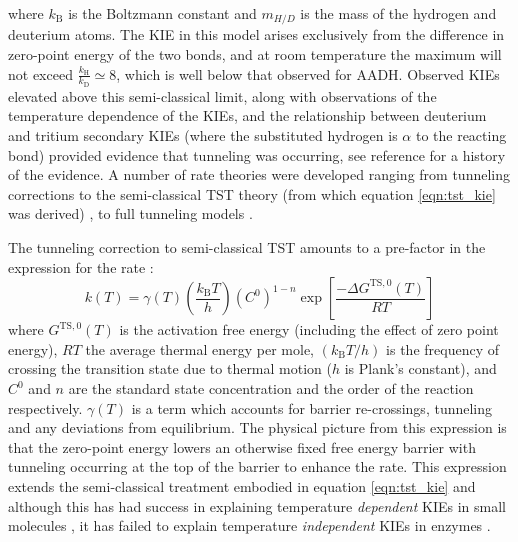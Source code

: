 where $k_{\mathrm{B}}$ is the Boltzmann constant and $m_{H/D}$ is the mass of the hydrogen and deuterium atoms. The KIE in this model arises exclusively from the difference in zero-point energy of the two bonds, and at room temperature the maximum will not exceed $\frac{k_{\mathrm{H}}}{k_{\mathrm{D}}} \simeq 8$,  which is well below that observed for AADH. Observed KIEs elevated above this semi-classical limit, along with observations of the temperature dependence of the KIEs, and the relationship between deuterium and tritium secondary KIEs (where the substituted hydrogen is $\alpha$ to the reacting bond) provided evidence that tunneling was occurring, see reference \cite{klinmanbeyond2009} for a history of the evidence. A number of rate theories were developed ranging from tunneling corrections to the semi-classical TST theory (from which equation \ref{eqn:tst_kie} was derived) \cite{bellTunnelEffectChemistry1980}, to full tunneling models \cite{antoniouLargeKineticIsotope1997, antoniouInternalEnzymeMotions2001, knappTemperatureDependentIsotopeEffects2002}. 

The tunneling correction to semi-classical TST amounts to a pre-factor in the expression for the rate \cite{garciavilocaHowEnzymesWork2004}: 
\begin{equation}\label{eqn:tst}
k(T) =\gamma(T)\left(\frac{k_{\mathrm{B}} T}{h}\right)\left(C^{0}\right)^{1-n}\exp \left[\frac{-\Delta G^{\mathrm{TS}, 0}(T)}{R T}\right]
\end{equation}
where $G^{\mathrm{TS}, 0}(T)$ is the activation free energy (including the effect of zero point energy), $RT$ the average thermal energy per mole, $\left(k_{\mathrm{B}} T / h\right)$ is the frequency of crossing the transition state due to thermal motion ($h$ is Plank's constant), and $C^{0}$ and $n$ are the standard state concentration and the order of the reaction respectively. $\gamma(T)$ is a term which accounts for barrier re-crossings, tunneling and any deviations from equilibrium. The physical picture from this expression is that the zero-point energy lowers an otherwise fixed free energy barrier with tunneling occurring at the top of the barrier to enhance the rate. This expression extends the semi-classical treatment embodied in equation \ref{eqn:tst_kie} and although this has had success in explaining temperature \emph{dependent} KIEs in small molecules \cite{bellTunnelEffectChemistry1980}, it has failed to explain temperature \emph{independent} KIEs in enzymes \cite{klinmanHydrogenTunnelingLinks2013}. 

